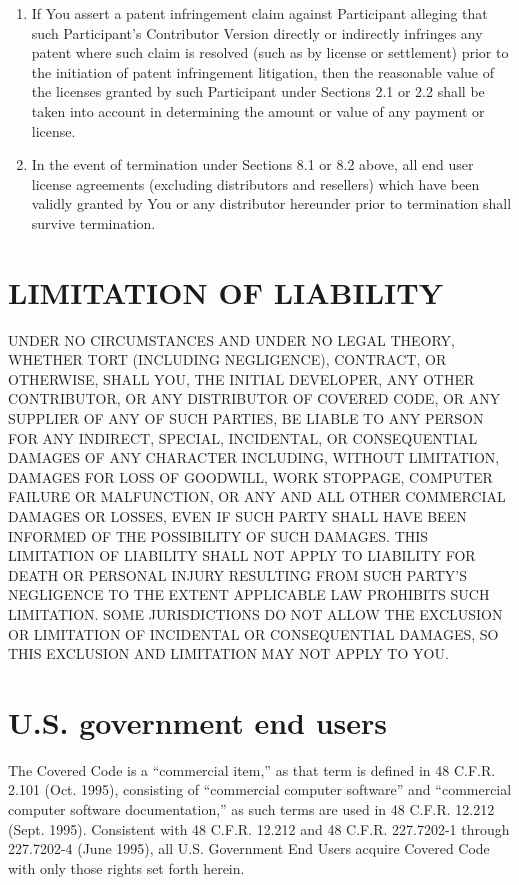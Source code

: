 \documentclass{book}
\begin{document}
\begin{enumerate}
\item If You assert a patent infringement claim against Participant alleging that such Participant's Contributor Version directly or indirectly infringes any patent where such claim is resolved (such as by license or settlement) prior to the initiation of patent infringement litigation, then the reasonable value of the licenses granted by such Participant under Sections 2.1 or 2.2 shall be taken into account in determining the amount or value of any payment or license. 

\item In the event of termination under Sections 8.1 or 8.2 above, all end user license agreements (excluding distributors and resellers) which have been validly granted by You or any distributor hereunder prior to termination shall survive termination. 
\end{enumerate}

\section{LIMITATION OF LIABILITY}
UNDER NO CIRCUMSTANCES AND UNDER NO LEGAL THEORY, WHETHER TORT (INCLUDING NEGLIGENCE), CONTRACT, OR OTHERWISE, SHALL YOU, THE INITIAL DEVELOPER, ANY OTHER CONTRIBUTOR, OR ANY DISTRIBUTOR OF COVERED CODE, OR ANY SUPPLIER OF ANY OF SUCH PARTIES, BE LIABLE TO ANY PERSON FOR ANY INDIRECT, SPECIAL, INCIDENTAL, OR CONSEQUENTIAL DAMAGES OF ANY CHARACTER INCLUDING, WITHOUT LIMITATION, DAMAGES FOR LOSS OF GOODWILL, WORK STOPPAGE, COMPUTER FAILURE OR MALFUNCTION, OR ANY AND ALL OTHER COMMERCIAL DAMAGES OR LOSSES, EVEN IF SUCH PARTY SHALL HAVE BEEN INFORMED OF THE POSSIBILITY OF SUCH DAMAGES. THIS LIMITATION OF LIABILITY SHALL NOT APPLY TO LIABILITY FOR DEATH OR PERSONAL INJURY RESULTING FROM SUCH PARTY'S NEGLIGENCE TO THE EXTENT APPLICABLE LAW PROHIBITS SUCH LIMITATION. SOME JURISDICTIONS DO NOT ALLOW THE EXCLUSION OR LIMITATION OF INCIDENTAL OR CONSEQUENTIAL DAMAGES, SO THIS EXCLUSION AND LIMITATION MAY NOT APPLY TO YOU. 

\section{U.S. government end users}
The Covered Code is a ``commercial item,'' as that term is defined in 48 C.F.R. 2.101 (Oct. 1995), consisting of ``commercial computer software'' and ``commercial computer software documentation,'' as such terms are used in 48 C.F.R. 12.212 (Sept. 1995). Consistent with 48 C.F.R. 12.212 and 48 C.F.R. 227.7202-1 through 227.7202-4 (June 1995), all U.S. Government End Users acquire Covered Code with only those rights set forth herein. 
\end{document}
